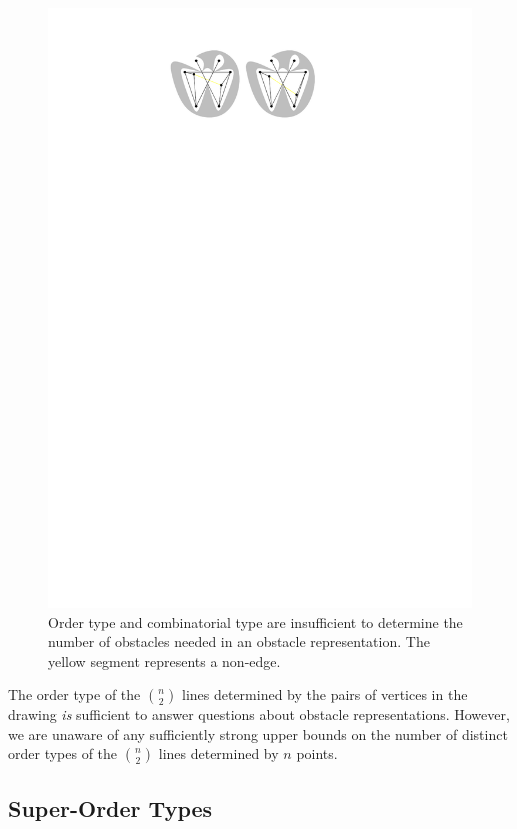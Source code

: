 \documentclass{patmorin}
\begin{document}
\begin{figure}[htbp]
  \begin{center}
    \includegraphics{order-type}
  \end{center}
  \caption{Order type and combinatorial type are insufficient to determine 
      the number of obstacles needed in an obstacle representation. The yellow
      segment represents a non-edge.}
\end{figure}

The order type of the $\binom{n}{2}$ lines determined by the pairs of
vertices in the drawing \emph{is} sufficient to answer questions about
obstacle representations.  However, we are unaware of any sufficiently
strong upper bounds on the number of distinct order types of the
$\binom{n}{2}$ lines determined by $n$ points.

\subsection{Super-Order Types}
\end{document}
